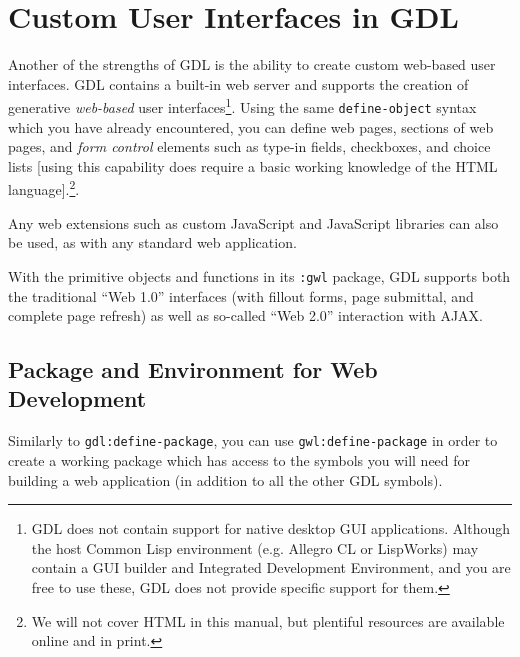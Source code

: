 \documentclass [11pt]{book}
\begin{document}
\chapter{Custom User Interfaces in GDL}

\label{chap:customuserinterfacesingdl}



Another of the strengths of GDL is the ability to create custom
web-based user interfaces. GDL contains a built-in web server and
supports the creation of generative \emph{web-based} user interfaces\footnote{GDL does not contain support for native desktop
GUI applications. Although the host Common Lisp
environment (e.g. Allegro CL or LispWorks) may contain a GUI builder
and Integrated Development Environment, and you are free to use these,
GDL does not provide specific support for them.}. Using the same \texttt{define-object} syntax which you have already encountered, you can define
web pages, sections of web pages, and \emph{form control} elements such as type-in fields, checkboxes, and choice
lists [using this capability does require a basic working knowledge of
the HTML language].\footnote{We will not cover HTML in this manual, but
plentiful resources are available online and in print.}.



Any web extensions such as custom JavaScript and JavaScript libraries
can also be used, as with any standard web application.



With the primitive objects and functions in its \texttt{:gwl} package, GDL supports both the traditional ``Web 1.0''
interfaces (with fillout forms, page submittal, and complete page
refresh) as well as so-called ``Web 2.0'' interaction with AJAX.



\section{Package and Environment for Web Development}

\label{sec:packageandenvironmentforwebdevelopment}



Similarly to \texttt{gdl:define-package}, you can use \texttt{gwl:define-package} in order to create a working package which has
access to the symbols you will need for building a web application (in
addition to all the other GDL symbols).
\end{document}
